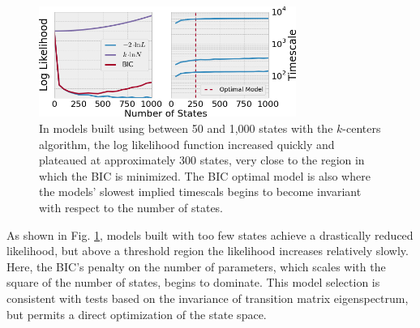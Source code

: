 \documentclass[twocolumn,floatfix,nofootinbib,aps]{revtex4-1}
\begin{document}
\begin{figure}[h]
\centering
\includegraphics[width=3.3in]{figs/muller_bic_timescales.png}
\caption{In models built using between 50 and 1,000 states with the $k$-centers algorithm, the log likelihood function increased quickly and plateaued at approximately 300 states, very close to the region in which the BIC is minimized. The BIC optimal model is also where the models' slowest implied timescals begins to become invariant with respect to the number of states.}
\label{fig:mullerlike}
\end{figure}

As shown in Fig. \ref{fig:mullerlike}, models built with too few states achieve a drastically reduced likelihood, but above a threshold region the likelihood increases relatively slowly. Here, the BIC's penalty on the number of parameters, which scales with the square of the number of states, begins to dominate. This model selection is consistent with tests based on the invariance of transition matrix eigenspectrum, but permits a direct optimization of the state space.
\end{document}
